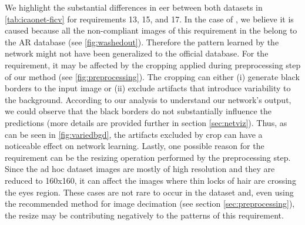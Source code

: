 We highlight the substantial differences in \acs{eer} between both datasets in \autoref{tab:icaonet-ficv} for requirements 13, 15, and 17. In the case of \citeReq{\washedout}, we believe it is caused because all the non-compliant images of this requirement in the \ficvtest belong to the AR database (see \autoref{fig:washedout}). Therefore the pattern learned by the network might not have been generalized to the official database. For the \citeReq{\variedbackground} requirement, it may be affected by the cropping applied during preprocessing step of our method (see \autoref{fig:preprocessing}). The cropping can either (i) generate black borders to the input image or (ii) exclude artifacts that introduce variability to the background. According to our analysis to understand our network's output, we could observe that the black borders do not substantially influence the predictions (more details are provided further in section \ref{sec:netviz}). Thus, as can be seen in \autoref{fig:variedbgd}, the artifacts excluded by crop can have a noticeable effect on network learning. Lastly, one possible reason for the \citeReq{\hairacrosseyes} requirement can be the resizing operation performed by the preprocessing step. Since the ad hoc dataset images are mostly of high resolution and they are reduced to 160x160, it can affect the images where thin locks of hair are crossing the eyes region. These cases are not rare to occur in the dataset and, even using the recommended method for image decimation (see section \ref{sec:preprocessing}), the resize may be contributing negatively to the patterns of this requirement. 

